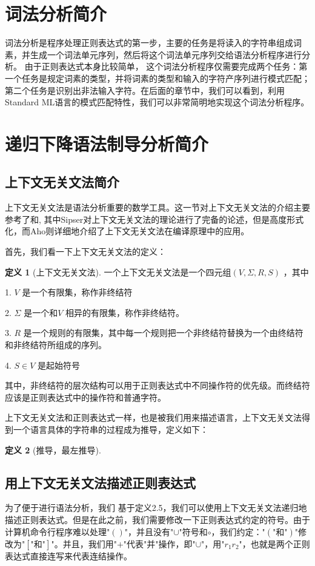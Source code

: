\documentclass[openany,oneside]{book}
\theoremstyle{definition}
\newtheorem{definition}{\hspace{2em}定义}[chapter]
\theoremstyle{definition}
\begin{document}
	\section{词法分析简介}
	词法分析是程序处理正则表达式的第一步，主要的任务是将读入的字符串组成词素，并生成一个词法单元序列，然后将这个词法单元序列交给语法分析程序进行分析。\cite{appel2004modern} 由于正则表达式本身比较简单， 这个词法分析程序仅需要完成两个任务：第一个任务是规定词素的类型，并将词素的类型和输入的字符产序列进行模式匹配；第二个任务是识别出非法输入字符。在后面的章节中，我们可以看到，利用Standard ML语言的模式匹配特性，我们可以非常简明地实现这个词法分析程序。
	\section{递归下降语法制导分析简介}
	
	\subsection{上下文无关文法简介}
	上下文无关文法是语法分析重要的数学工具。这一节对上下文无关文法的介绍主要参考了\cite{2002编译原理}和\cite{Sips05a}, 其中Sipser\cite{Sips05a}对上下文无关文法的理论进行了完备的论述，但是高度形式化，而Aho\cite{2002编译原理}则详细地介绍了上下文无关文法在编译原理中的应用。
	
	首先，我们看一下上下文无关文法的定义：
	\begin{definition}[上下文无关文法]
		一个上下文无关文法是一个四元组\(\left( V, \Sigma , R , S \right) \) ，其中
		
		1. \(V\) 是一个有限集，称作非终结符
		
		2. \(\Sigma\) 是一个和\(V\) 相异的有限集，称作非终结符。
		
		3. \(R\) 是一个规则的有限集，其中每一个规则把一个非终结符替换为一个由终结符和非终结符所组成的序列。
		
		4. \( S \in V\) 是起始符号
		
	\end{definition}
	 其中，非终结符的层次结构可以用于正则表达式中不同操作符的优先级。而终结符应该是正则表达式中的操作符和普通字符。
	 
	 
	 上下文无关文法和正则表达式一样，也是被我们用来描述语言，上下文无关文法得到一个语言具体的字符串的过程成为推导，定义如下：
	 \begin{definition}[推导，最左推导]
	 	
	 \end{definition}
	\subsection{用上下文无关文法描述正则表达式}
	为了便于进行语法分析，我们
	基于定义2.5，我们可以使用上下文无关文法递归地描述正则表达式。但是在此之前，我们需要修改一下正则表达式约定的符号。由于计算机命令行程序难以处理"\(\left(\right)\)"，并且没有"\(\cup\)"符号和\(\circ\)，我们约定：\(\mbox{"}\left(\mbox{"和"}\right)\mbox{"}\)修改为\(\mbox{"}\left[  \mbox{"和"}\right]\mbox{"}\)。并且，我们用"\(+\)"代表"并"操作，即"\(\cup\)"，用"\(r_1 r_2\)"，也就是两个正则表达式直接连写来代表连结操作。
	
\end{document}
